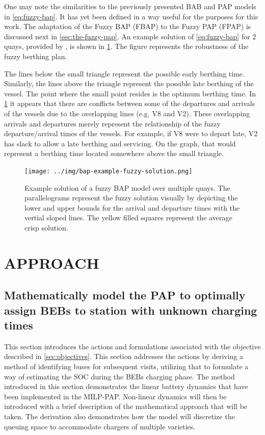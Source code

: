 \documentclass[ee,msthesis]{usuthesis}
\begin{document}
One may note the similarities to the previously presented BAB and PAP models in \ref{eq:fuzzy-bap}. It has yet been defined
in a way useful for the purposes for this work. The adaptation of the Fuzzy BAP (FBAP) to the Fuzzy PAP (FPAP) is
discussed next in \ref{sec:the-fuzzy-pap}. An example solution of \ref{eq:fuzzy-bap} for 2 quays, provided by
\cite{bello-2019-fuzzy-activ}, is shown in \ref{fig:bap-example-solution}. The figure represents the robustness of the fuzzy
berthing plan.

The lines below the small triangle represent the possible early berthing time. Similarly, the lines above the triangle
represent the possible late berthing of the vessel. The point where the small point resides is the optimum berthing
time. In \ref{fig:bap-example-solution} it appears that there are conflicts between some of the departures and arrivals of the
vessels due to the overlapping lines (e.g. V8 and V2). These overlapping arrivals and departures merely represent the
relationship of the fuzzy departure/arrival times of the vessels. For example, if V8 were to depart late, V2 has slack
to allow a late berthing and servicing. On the graph, that would represent a berthing time located somewhere above the
small triangle.

\begin{figure}[htbp]
\centering
\texttt{[image: ../img/bap-example-fuzzy-solution.png]}
\caption{\label{fig:bap-example-solution}Example solution of a fuzzy BAP model over multiple quays. The parallelograms represent the fuzzy solution visually by depicting the lower and upper bounds for the arrival and departure times with the vertial sloped lines. The yellow filled squares represent the average crisp solution.}
\end{figure}
\chapter{APPROACH}
\label{sec:approach}
\section{Mathematically model the PAP to optimally assign BEBs to station with unknown charging times}
\label{sec:math-model-pap}
This section introduces the actions and formulations associated with the objective described in \ref{sec:objectives}. This
section addresses the actions by deriving a method of identifying buses for subsequent visits, utilizing that to
formulate a way of estimating the SOC during the BEBs charging phase. The method introduced in this section demonstrates
the linear battery dynamics that have been implemented in the MILP-PAP. Non-linear dynamics will then be introduced with
a brief description of the mathematical approach that will be taken. The derivation also demonstrates how the model will
discretize the queuing space to accommodate chargers of multiple varieties.
\end{document}
